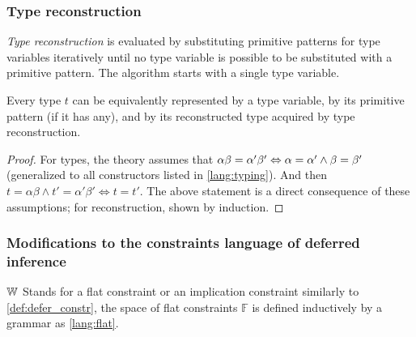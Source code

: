 \subsubsection{Type reconstruction}

\emph{Type reconstruction} is evaluated by substituting primitive patterns for type variables iteratively until no type variable is possible to be substituted with a primitive pattern. The algorithm starts with a single type variable.

\begin{lemma}
    \label{typesObs}
    Every type $t$ can be equivalently represented by a type variable, by its primitive pattern (if it has any), and by its reconstructed type acquired by type reconstruction.

    \begin{proof}
        For types, the theory assumes that  $\alpha \beta = \alpha' \beta' \Leftrightarrow \alpha = \alpha' \land \beta = \beta'$  (generalized to all constructors listed in \cref{lang:typing}). And then $t = \alpha \beta \land t' = \alpha' \beta' \Leftrightarrow t = t'$. The above statement is a direct consequence of these assumptions; for reconstruction, shown by induction.
    \end{proof}
\end{lemma}


\subsubsection{Modifications to the constraints language of deferred inference}

$\mathbb{W}$ Stands for a flat constraint or an implication constraint similarly to \cref{def:defer_constr}, the space of flat constraints $\mathbb{F}$ is defined inductively by a grammar as \cref{lang:flat}.

